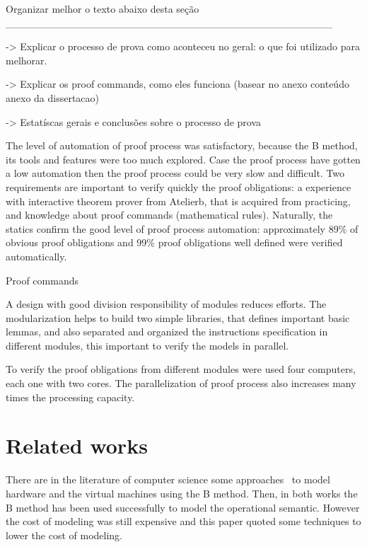 \documentclass[11pt]{article} %
\begin{document}
Organizar melhor o texto abaixo desta seção
____________________________________________

-> Explicar o processo de prova como aconteceu no geral: o que foi utilizado para melhorar. 

-> Explicar os proof commands, como eles funciona (basear no anexo conteúdo anexo da dissertacao)

-> Estatíscas gerais e conclusões sobre o processo  de prova


The level of automation of proof process was satisfactory, because the B method, its tools and features were too much explored.
Case the proof process have gotten a low automation then the proof process could be very slow and difficult. Two requirements are important
to verify quickly the proof obligations: a experience with interactive theorem prover from Atelierb, that is acquired from practicing, and 
knowledge about proof commands (mathematical rules)\cite{Manual_MathematicalRules}. Naturally, the statics confirm the good level of proof process
automation: approximately 89\% of obvious proof obligations and 99\% proof obligations well defined were verified automatically.   


Proof commands

A design with good division responsibility of modules reduces efforts. The modularization helps to build two simple libraries, that defines
important basic lemmas, and also separated and organized the instructions specification in different modules, this important to verify the models 
in parallel. 

To verify the proof obligations from different modules were used four computers, each one with two cores. 
The parallelization of proof process also increases many times the processing capacity.






\section{Related works}
\label{sec:relatedworks}
 
There are in the literature of computer science some
approaches~\cite{BHDL_2003,GEMPLUS_99} to model hardware and the virtual machines
using the B method. Then, in both works the B method has been used successfully
to model the operational semantic. However the cost of modeling was still expensive and this
paper quoted some techniques to lower the cost of modeling.
\end{document}
